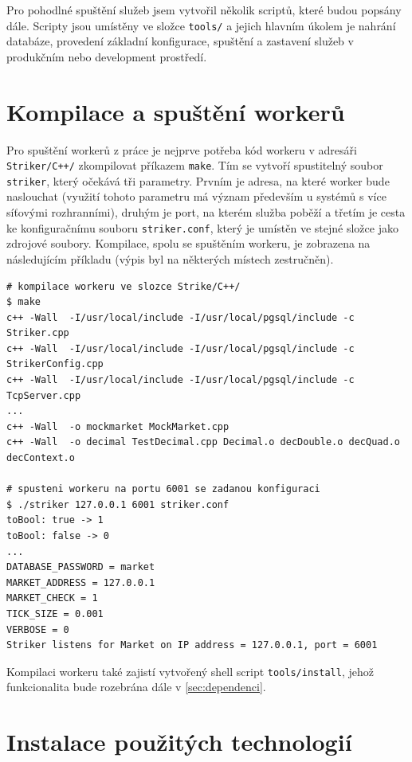 \documentclass[thesis=M,czech]{FITthesis}[2012/06/26]
\begin{document}
	Pro pohodlné spuštění služeb jsem vytvořil několik scriptů, které budou popsány dále. Scripty jsou umístěny ve složce \texttt{tools/} a jejich hlavním úkolem je nahrání databáze, provedení základní konfigurace, spuštění a zastavení služeb v produkčním nebo development prostředí.
	
\section{Kompilace a spuštění workerů}
	
	Pro spuštění workerů z práce \cite{Fremunt2014} je nejprve potřeba kód workeru v adresáři \texttt{Striker/C++/} zkompilovat příkazem \texttt{make}. Tím se vytvoří spustitelný soubor \texttt{striker}, který očekává tři parametry. Prvním je adresa, na které worker bude naslouchat (využití tohoto parametru má význam především u systémů s více síťovými rozhranními), druhým je port, na kterém služba poběží a třetím je cesta ke konfiguračnímu souboru \texttt{striker.conf}, který je umístěn ve stejné složce jako zdrojové soubory. Kompilace, spolu se spuštěním workeru, je zobrazena na následujícím příkladu (výpis byl na některých místech zestručněn).

\begin{lstlisting}[basicstyle={\tiny\ttfamily}, frame=single] 	
# kompilace workeru ve slozce Strike/C++/
$ make
c++ -Wall  -I/usr/local/include -I/usr/local/pgsql/include -c Striker.cpp
c++ -Wall  -I/usr/local/include -I/usr/local/pgsql/include -c StrikerConfig.cpp
c++ -Wall  -I/usr/local/include -I/usr/local/pgsql/include -c TcpServer.cpp
... 
c++ -Wall  -o mockmarket MockMarket.cpp
c++ -Wall  -o decimal TestDecimal.cpp Decimal.o decDouble.o decQuad.o decContext.o 

# spusteni workeru na portu 6001 se zadanou konfiguraci
$ ./striker 127.0.0.1 6001 striker.conf 
toBool: true -> 1
toBool: false -> 0
...
DATABASE_PASSWORD = market
MARKET_ADDRESS = 127.0.0.1
MARKET_CHECK = 1
TICK_SIZE = 0.001
VERBOSE = 0
Striker listens for Market on IP address = 127.0.0.1, port = 6001
\end{lstlisting}

	Kompilaci workeru také zajistí vytvořený shell script \texttt{tools/install}, jehož funkcionalita bude rozebrána dále v \ref{sec:dependenci}.

\section{Instalace použitých technologií}
\end{document}
